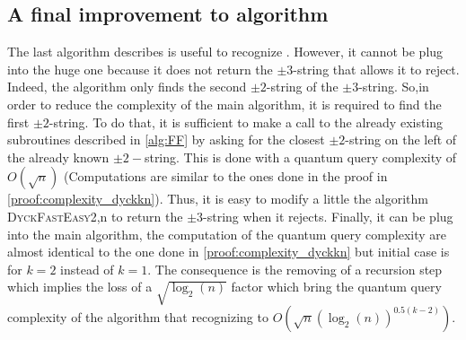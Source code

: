 \subsection{A final improvement to  algorithm}

The last algorithm describes is useful to recognize . However, it cannot
be plug into the huge one because it does not return the $\pm 3$-string that
allows it to reject. Indeed, the algorithm only finds the second $\pm 2$-string
of the $\pm 3$-string. So,in order to reduce the complexity of the main algorithm,
it is required to find the first  $\pm 2$-string. To do that, it is sufficient
to make a call to the already existing subroutines  described in
\autoref{alg:FF} by asking for the closest $\pm 2$-string on the left of the
already known $\pm 2-$string. This is done with a quantum query complexity of
$O(\sqrt{n})$ (Computations are similar to the ones done in the proof in
\autoref{proof:complexity_dyckkn}). Thus, it is easy to modify a little
the algorithm \textsc{DyckFastEasy}{2,n} to return the $\pm 3$-string when
it rejects. Finally, it can be plug into the main algorithm, the computation
of the quantum query complexity are almost identical to the one done in
\autoref{proof:complexity_dyckkn} but initial case is for $k=2$ instead of $k=1$.
The consequence is the removing of a recursion step which implies the loss of
a $\sqrt{\log_2(n)}$ factor which bring the quantum query complexity of
the algorithm that recognizing  to $O(\sqrt{n}(\log_2(n))^{0.5(k-2)})$.